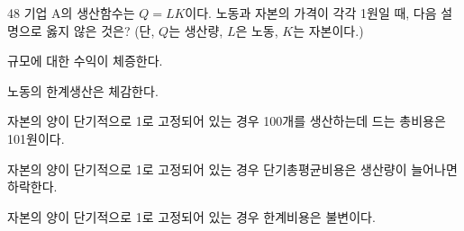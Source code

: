 \begin{question}{48}
기업 A의 생산함수는 $Q=LK$이다. 노동과 자본의 가격이 각각 1원일 때, 다음 설명으로 옳지 않은 것은? (단, $Q$는 생산량, $L$은 노동, $K$는 자본이다.)
\begin{choices}
  \item 규모에 대한 수익이 체증한다.
  \item 노동의 한계생산은 체감한다.
  \item 자본의 양이 단기적으로 1로 고정되어 있는 경우 100개를 생산하는데 드는 총비용은 101원이다.
  \item 자본의 양이 단기적으로 1로 고정되어 있는 경우 단기총평균비용은 생산량이 늘어나면 하락한다.
  \item 자본의 양이 단기적으로 1로 고정되어 있는 경우 한계비용은 불변이다.
\end{choices}
\end{question}
